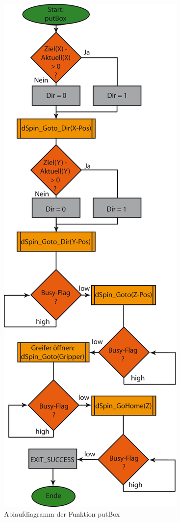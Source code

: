 \begin{figure}[h]
\includegraphics[scale = 0.8]{./putBox.png}
\hspace{-14pt}
\caption{Ablaufdiagramm der Funktion putBox}
\end{figure} 

